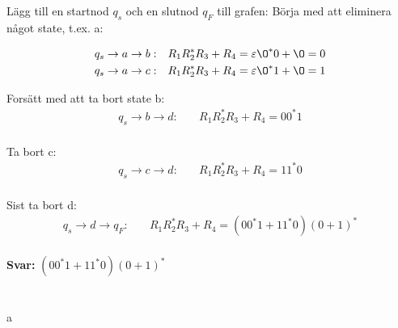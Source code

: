 \documentclass{article}
\begin{document}
\section{}
Lägg till en startnod $q_s$ och en slutnod $q_F$ till grafen: 
Börja med att eliminera något state, t.ex. a:

\begin{align*}
q_s \to a \to b: & \quad R_1R_2^*R_3+R_4 = \varepsilon\O^*0+\O = 0 \\
q_s \to a \to c: & \quad R_1R_2^*R_3+R_4 = \varepsilon\O^*1+\O = 1
\end{align*}

Forsätt med att ta bort state b:
\begin{align*}
q_s \to b \to d: & \quad R_1R_2^*R_3+R_4 = 00^*1 \\
\end{align*}

Ta bort c:
\begin{align*}
q_s \to c \to d: & \quad R_1R_2^*R_3+R_4 = 11^*0 \\
\end{align*}

Sist ta bort d:
\begin{align*}
q_s \to d \to q_F: & \quad R_1R_2^*R_3+R_4 = (00^*1+11^*0)(0+1)^* \\
\end{align*}


\textbf{Svar: } $(00^*1+11^*0)(0+1)^*$

\section{}
a
\end{document}
